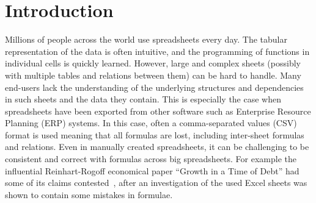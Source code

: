 \documentclass{IEEEtran}
\theoremstyle{definition}
\begin{document}
\section{Introduction}
Millions of people across the world use spreadsheets every day.
The tabular representation of the data is often intuitive, and the programming of functions in individual cells is quickly learned.
However, large and complex sheets (possibly with multiple tables and relations between them) can be hard to handle.
Many end-users lack the understanding of the underlying structures and dependencies in such sheets and the data they contain.
This is especially the case when spreadsheets have been exported from other software such as Enterprise Resource Planning (ERP) systems.
In this case, often a comma-separated values (CSV) format is used meaning that all formulas are lost, including inter-sheet formulas and relations.
Even in manually created spreadsheets, it can be challenging to be consistent and correct with formulas across big spreadsheets.
For example the influential Reinhart-Rogoff economical paper ``Growth in a Time of Debt'' had some of its claims contested~\cite{flaw_excel}, after an investigation of the used Excel sheets was shown to contain some mistakes in formulae.
\end{document}
